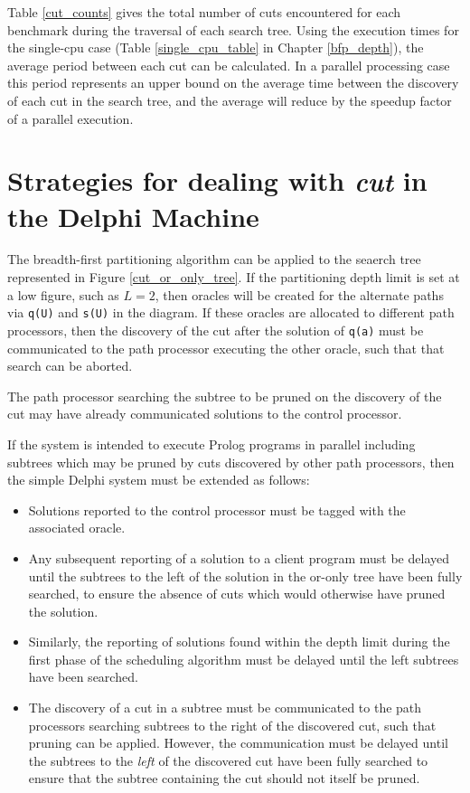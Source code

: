 Table \ref{cut_counts} gives the total number of cuts encountered for each benchmark during
the traversal of each search tree.  Using the execution times for the single-cpu case
(Table \ref{single_cpu_table} in Chapter \ref{bfp_depth}), the average period between
each cut can be calculated.  In a parallel processing case this period represents an
upper bound on the average time between the discovery of each cut in the search tree,
and the average will reduce by the speedup factor of a parallel execution.

\section{Strategies for dealing with \textit{cut} in the Delphi Machine} %

The breadth-first partitioning algorithm can be applied to the 
seaerch tree represented in Figure \ref{cut_or_only_tree}.  If the 
partitioning depth limit
is set at a low figure, such as $L=2$, then oracles will be created for the
alternate paths via \texttt{q(U)} and \texttt{s(U)} in the diagram.  If these
oracles are allocated to different path processors, then the discovery of the
cut after the solution of \texttt{q(a)} must be communicated to the path
processor executing the other oracle, such that that search can be aborted.

The path processor searching the subtree to be pruned on the discovery of the
cut may have already communicated solutions to the control processor.

If the system is intended to execute Prolog programs in parallel including
subtrees which may be pruned by cuts discovered by other path processors, then
the simple Delphi system must be extended as follows:
\begin{itemize}
\item{Solutions reported to the control processor must be tagged with the
  associated oracle.}
\item{Any subsequent reporting of a solution to a client program must be delayed until the
  subtrees to the left of the solution in the or-only tree have been fully
  searched, to ensure the absence of cuts which would otherwise have pruned the
  solution.}
\item{Similarly, the reporting of solutions found within the depth limit during the first phase
  of the scheduling algorithm must be delayed until the left subtrees have been searched.}
\item{The discovery of a cut in a subtree must be communicated to the path processors
  searching subtrees to the right of the discovered cut, such that pruning can be applied.
  However, the communication must be delayed until the subtrees to the \textit{left} of
  the discovered cut have been fully searched to ensure that the subtree containing the
  cut should not itself be pruned.}
\end{itemize}

